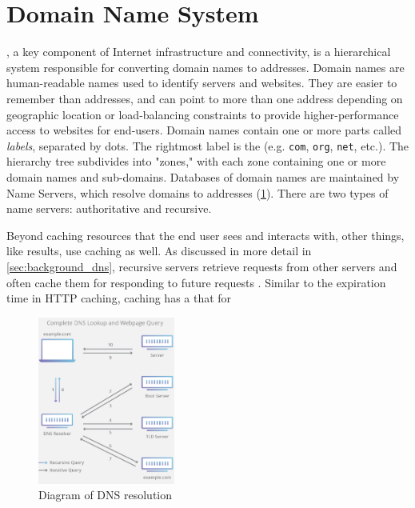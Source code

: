 \section{Domain Name System}\label{sec:background_dns}

\dns, a key component of Internet infrastructure and connectivity, is a hierarchical system responsible for converting domain names to \ip addresses. Domain names are human-readable names used to identify servers and websites. They are easier to remember than \ip addresses, and can point to more than one address depending on geographic location or load-balancing constraints to provide higher-performance access to websites for end-users. Domain names contain one or more parts called \textit{labels}, separated by dots. The rightmost label is the \tld (e.g. \texttt{com}, \texttt{org}, \texttt{net}, etc.). The \dns hierarchy tree subdivides into "zones," with each zone containing one or more domain names and sub-domains. Databases of domain names are maintained by \dns Name Servers, which resolve domains to \ip addresses  (\cref{fig:dns_resolution}). There are two types of name servers: authoritative and recursive.

Beyond caching resources that the end user sees and interacts with, other things, like \dns results, use caching as well. As discussed in more detail in \autoref{sec:background_dns}, recursive \dns servers retrieve requests from other \dns servers and often cache them for responding to future requests \cite{rfc1035}. Similar to the expiration time  in HTTP caching, \dns caching has a \ttl that for

\begin{figure}
    \centering
    \includegraphics[width=0.4\textwidth]{images/other/dns_lookup_diagram.png}
    \caption{Diagram of DNS resolution \cite{Cloudflare2020a}}
    \label{fig:dns_resolution}
\end{figure}

